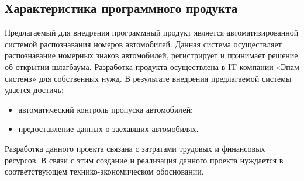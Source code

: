 









\FPround{}


\subsection{Характеристика программного продукта }

Предлагаемый для внедрения программный продукт является автоматизированной системой распознавания номеров автомобилей. Данная система осуществляет распознавание номерных знаков автомобилей, регистрирует и принимает решение об открытии шлагбаума. 
Разработка продукта осуществлена в IT-компании «Эпам системз» для собственных нужд. В результате внедрения предлагаемой системы удается достичь:
\begin{itemize}
  \item автоматический контроль пропуска автомобилей;
  \item предоставление данных о заехавших автомобилях. 
\end{itemize}
Разработка данного проекта связана с затратами трудовых и финансовых ресурсов. В связи с этим создание и реализация данного проекта нуждается в соответствующем технико-экономическом обосновании.

